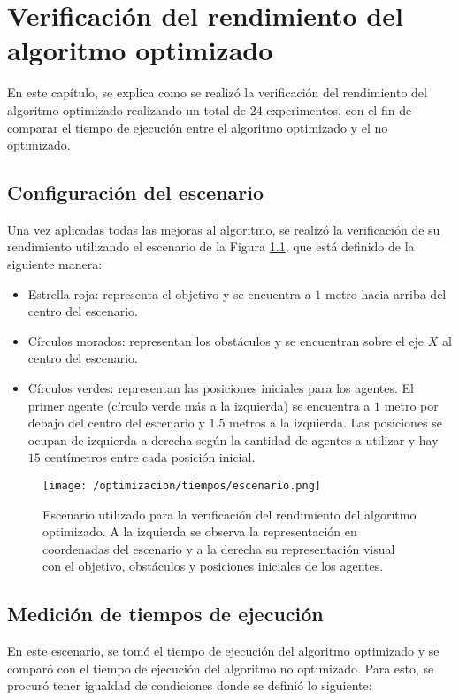 \chapter{Verificación del rendimiento del algoritmo optimizado}
En este capítulo, se explica como se realizó la verificación del rendimiento del algoritmo optimizado realizando un total de $24$ experimentos, con el fin de comparar el tiempo de ejecución entre el algoritmo optimizado y el no optimizado.

\section{Configuración del escenario}
Una vez aplicadas todas las mejoras al algoritmo, se realizó la verificación de su rendimiento utilizando el escenario de la Figura \ref{fig:escenario_optimizacion}, que está definido de la siguiente manera:
\begin{itemize}
	\item Estrella roja: representa el objetivo y se encuentra a $1$ metro hacia arriba del centro del escenario.
	\item Círculos morados: representan los obstáculos y se encuentran sobre el eje $X$ al centro del escenario.
	\item Círculos verdes: representan las posiciones iniciales para los agentes. El primer agente (círculo verde más a la izquierda) se encuentra a $1$ metro por debajo del centro del escenario y $1.5$ metros a la izquierda. Las posiciones se ocupan de izquierda a derecha según la cantidad de agentes a utilizar y hay $15$ centímetros entre cada posición inicial.
\end{itemize}

\begin{figure}[H]
	\centering
	\texttt{[image: /optimizacion/tiempos/escenario.png]}
	\caption{Escenario utilizado para la verificación del rendimiento del algoritmo optimizado. A la izquierda se observa la representación en coordenadas del escenario y a la derecha su representación visual con el objetivo, obstáculos y posiciones iniciales de los agentes.}
	\label{fig:escenario_optimizacion}
\end{figure}

\section{Medición de tiempos de ejecución}
En este escenario, se tomó el tiempo de ejecución del algoritmo optimizado y se comparó con el tiempo de ejecución del algoritmo no optimizado. Para esto, se procuró tener igualdad de condiciones donde se definió lo siguiente:


